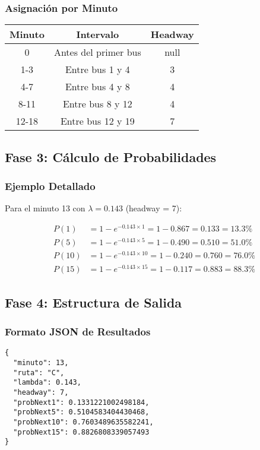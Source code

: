\documentclass[12pt,a4paper]{article}
\begin{document}
\subsubsection{Asignación por Minuto}

\begin{center}
\begin{tabular}{|c|c|c|}
\hline
\textbf{Minuto} & \textbf{Intervalo} & \textbf{Headway} \\
\hline
0 & Antes del primer bus & null \\
1-3 & Entre bus 1 y 4 & 3 \\
4-7 & Entre bus 4 y 8 & 4 \\
8-11 & Entre bus 8 y 12 & 4 \\
12-18 & Entre bus 12 y 19 & 7 \\
\hline
\end{tabular}
\end{center}

\subsection{Fase 3: Cálculo de Probabilidades}

\subsubsection{Ejemplo Detallado}

Para el minuto 13 con $\lambda = 0.143$ (headway = 7):

\begin{align}
P(1) &= 1 - e^{-0.143 \times 1} = 1 - 0.867 = 0.133 = 13.3\% \\
P(5) &= 1 - e^{-0.143 \times 5} = 1 - 0.490 = 0.510 = 51.0\% \\
P(10) &= 1 - e^{-0.143 \times 10} = 1 - 0.240 = 0.760 = 76.0\% \\
P(15) &= 1 - e^{-0.143 \times 15} = 1 - 0.117 = 0.883 = 88.3\%
\end{align}

\subsection{Fase 4: Estructura de Salida}

\subsubsection{Formato JSON de Resultados}

\begin{lstlisting}[caption=Ejemplo de resultado]
{
  "minuto": 13,
  "ruta": "C",
  "lambda": 0.143,
  "headway": 7,
  "probNext1": 0.1331221002498184,
  "probNext5": 0.5104583404430468,
  "probNext10": 0.7603489635582241,
  "probNext15": 0.8826808339057493
}
\end{lstlisting}
\end{document}
